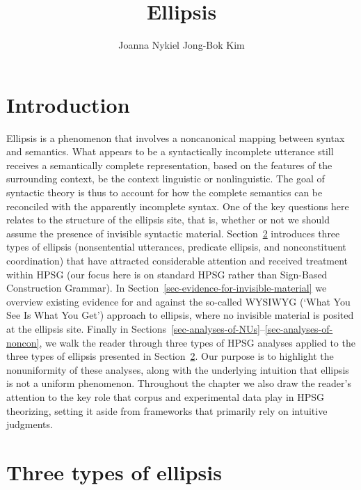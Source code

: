 \documentclass[output=paper
                ,modfonts
                ,nonflat
	        ,collection
	        ,collectionchapter
	        ,collectiontoclongg
 	        ,biblatex
                ,babelshorthands
                ,newtxmath
                ,draftmode
                ,colorlinks, citecolor=brown
]{./langsci/langscibook}
\author{%
	Joanna Nykiel\affiliation{Kyung Hee University, Seoul}%
	\lastand Jong-Bok Kim\affiliation{Kyung Hee University, Seoul}%
}
\title{Ellipsis}
\begin{document}
\maketitle
\label{chap-ellipsis}

{

\section{Introduction}
\label{ellipsis-sec-introduction}

Ellipsis is a phenomenon that involves a noncanonical mapping between syntax and semantics. What appears to be a syntactically incomplete utterance still receives a semantically complete representation, based on the features of the surrounding context, be the context linguistic or nonlinguistic. The goal of syntactic theory is thus to account for how the complete semantics can be reconciled with the apparently incomplete syntax. One of the key questions here relates to the structure of the ellipsis site, that is, whether or not we should assume the presence of invisible syntactic material. Section~\ref{sec-three-types-of-ellipsis} introduces three types of ellipsis (nonsentential utterances, predicate ellipsis, and nonconstituent coordination) that have attracted considerable attention and received treatment within HPSG (our focus here is on standard HPSG rather than Sign-Based Construction Grammar). In Section~\ref{sec-evidence-for-invisible-material} we overview existing evidence for and against the so-called WYSIWYG (`What You See Is What You Get') approach to ellipsis, where no invisible material is posited at the ellipsis site. Finally in Sections~\ref{sec-analyses-of-NUs}--\ref{sec-analyses-of-noncon}, we walk the reader through three types of HPSG analyses applied to the three types of ellipsis presented in Section~\ref{sec-three-types-of-ellipsis}. Our purpose is to highlight the nonuniformity of these analyses, along with the underlying intuition that ellipsis is not a uniform phenomenon. Throughout the chapter we also draw the reader's attention to the key role that corpus and experimental data play in HPSG theorizing, setting it aside from frameworks that primarily rely on intuitive judgments.




\section{Three types of ellipsis}
\label{sec-three-types-of-ellipsis}

}
\end{document}

